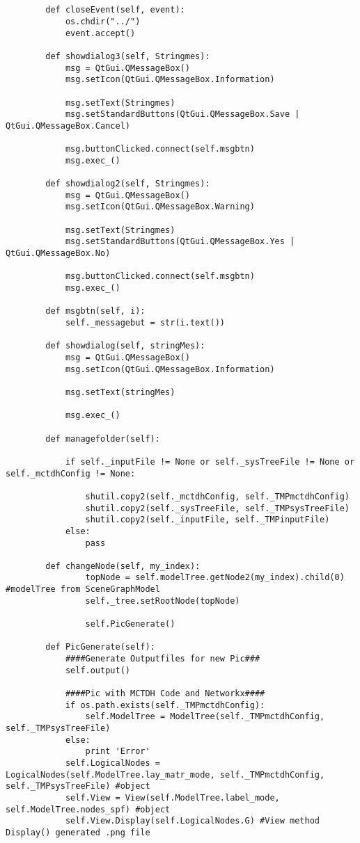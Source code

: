 \begin{verbatim}
    
    
        def closeEvent(self, event):
            os.chdir("../")
            event.accept()
    
        def showdialog3(self, Stringmes):
            msg = QtGui.QMessageBox()
            msg.setIcon(QtGui.QMessageBox.Information)
    
            msg.setText(Stringmes)
            msg.setStandardButtons(QtGui.QMessageBox.Save | QtGui.QMessageBox.Cancel)
    
            msg.buttonClicked.connect(self.msgbtn)
            msg.exec_()
    
        def showdialog2(self, Stringmes):
            msg = QtGui.QMessageBox()
            msg.setIcon(QtGui.QMessageBox.Warning)
    
            msg.setText(Stringmes)
            msg.setStandardButtons(QtGui.QMessageBox.Yes | QtGui.QMessageBox.No)
    
            msg.buttonClicked.connect(self.msgbtn)
            msg.exec_()
    
        def msgbtn(self, i):
            self._messagebut = str(i.text())
    
        def showdialog(self, stringMes):
            msg = QtGui.QMessageBox()
            msg.setIcon(QtGui.QMessageBox.Information)
    
            msg.setText(stringMes)
    
            msg.exec_()   
    
        def managefolder(self):
    
            if self._inputFile != None or self._sysTreeFile != None or self._mctdhConfig != None:
    
                shutil.copy2(self._mctdhConfig, self._TMPmctdhConfig)
                shutil.copy2(self._sysTreeFile, self._TMPsysTreeFile)
                shutil.copy2(self._inputFile, self._TMPinputFile)
            else:
                pass
    
        def changeNode(self, my_index):
                topNode = self.modelTree.getNode2(my_index).child(0) #modelTree from SceneGraphModel
                self._tree.setRootNode(topNode)
                
                self.PicGenerate()
    
        def PicGenerate(self):
            ####Generate Outputfiles for new Pic###
            self.output()
    
            ####Pic with MCTDH Code and Networkx####
            if os.path.exists(self._TMPmctdhConfig):
                self.ModelTree = ModelTree(self._TMPmctdhConfig, self._TMPsysTreeFile)
            else:
                print 'Error'
            self.LogicalNodes = LogicalNodes(self.ModelTree.lay_matr_mode, self._TMPmctdhConfig, self._TMPsysTreeFile) #object
            self.View = View(self.ModelTree.label_mode, self.ModelTree.nodes_spf) #object
            self.View.Display(self.LogicalNodes.G) #View method Display() generated .png file
    

\end{verbatim}

